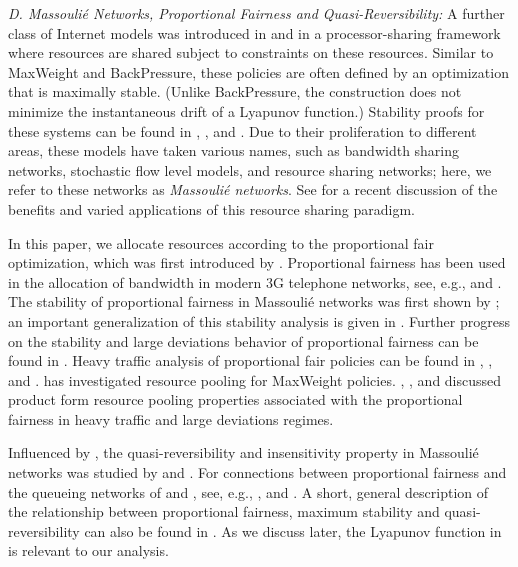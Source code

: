 \documentclass{amsart}
\begin{document}
\emph{D. Massouli\'e Networks, Proportional Fairness and Quasi-Reversibility:}
A further class of  Internet models was introduced in \cite{MaRo99} and
\cite{massoulie2000bandwidth}
in a processor-sharing framework where resources are shared subject to constraints on these resources. 
Similar to MaxWeight and BackPressure, these policies are often defined by an optimization that is maximally stable.  (Unlike BackPressure, the construction does not minimize the instantaneous drift of a Lyapunov function.) Stability proofs for these systems can be found in \cite{BoMa01}, \cite{Ye05}, \cite{GW09} and \cite{PAFA12}. Due to their proliferation to different areas, these models have taken various names, such as bandwidth sharing networks, stochastic flow level models, and resource sharing networks; here, we refer to these networks as \emph{Massouli\'e networks}. See \cite{HMSY14} for a recent discussion of the benefits and varied applications of this resource sharing paradigm.

In this paper, we allocate resources according to the proportional fair optimization, 
which was first introduced by \cite{Ke97}. Proportional fairness has been 
used in the allocation of bandwidth in modern 3G telephone networks, see, e.g., \cite{VTL02} and \cite{KuWh04}.  The stability of proportional fairness in Massouli\'e networks was first shown by \cite{DLK99}; an important generalization of this stability analysis is given in \cite{Ma07}. Further progress on the stability and large deviations behavior of proportional fairness can be found in \cite{JoLo14}. Heavy traffic analysis of proportional fair policies can be found in \cite{KKLW07i}, \cite{Ye12}, and \cite{VZZ14}. \cite{St04} has investigated resource pooling for MaxWeight policies. \cite{KKLW07ii},  \cite{KKLW07i}, \cite{KMW09} and \cite{Ye12} discussed product form resource pooling properties associated with the proportional fairness in heavy traffic and large deviations regimes.

Influenced by \cite{Wh85}, the quasi-reversibility and insensitivity property in Massouli\'e networks was studied by \cite{BoPr02,BoPr03,BoPr04} and \cite{Za07}. 
For connections between proportional fairness and the queueing networks of \cite{Ke75} and \cite{BCMP75}, see, e.g., \cite{Sc79,Ke89,MaRo99,Wa09}, and \cite{MOR13}.
A short, general description of the relationship between proportional fairness, maximum stability and quasi-reversibility can also be found in \cite{Wa11B}.
 As we discuss later, the Lyapunov function in \cite{Ma07} is relevant to our analysis. 
\end{document}

